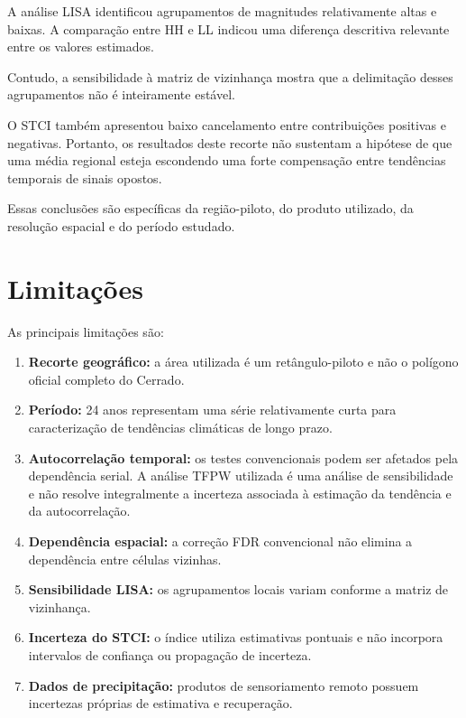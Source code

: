 \documentclass[12pt,a4paper]{article}
\begin{document}
A análise LISA identificou agrupamentos de
magnitudes relativamente altas e baixas. A
comparação entre HH e LL indicou uma diferença
descritiva relevante entre os valores estimados.

Contudo, a sensibilidade à matriz de vizinhança
mostra que a delimitação desses agrupamentos
não é inteiramente estável.

O STCI também apresentou baixo cancelamento
entre contribuições positivas e negativas.
Portanto, os resultados deste recorte não
sustentam a hipótese de que uma média regional
esteja escondendo uma forte compensação entre
tendências temporais de sinais opostos.

Essas conclusões são específicas da região-piloto,
do produto utilizado, da resolução espacial e
do período estudado.

\section{Limitações}

As principais limitações são:

\begin{enumerate}
    \item \textbf{Recorte geográfico:} a área utilizada
    é um retângulo-piloto e não o polígono oficial
    completo do Cerrado.

    \item \textbf{Período:} 24 anos representam uma
    série relativamente curta para caracterização
    de tendências climáticas de longo prazo.

    \item \textbf{Autocorrelação temporal:} os testes
    convencionais podem ser afetados pela dependência
    serial. A análise TFPW utilizada é uma análise
    de sensibilidade e não resolve integralmente
    a incerteza associada à estimação da tendência
    e da autocorrelação.

    \item \textbf{Dependência espacial:} a correção
    FDR convencional não elimina a dependência
    entre células vizinhas.

    \item \textbf{Sensibilidade LISA:} os agrupamentos
    locais variam conforme a matriz de vizinhança.

    \item \textbf{Incerteza do STCI:} o índice utiliza
    estimativas pontuais e não incorpora intervalos
    de confiança ou propagação de incerteza.

    \item \textbf{Dados de precipitação:} produtos
    de sensoriamento remoto possuem incertezas
    próprias de estimativa e recuperação.
\end{enumerate}
\end{document}
